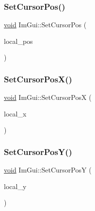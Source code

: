 \subsubsection{\texorpdfstring{Set\+Cursor\+Pos()}{SetCursorPos()}}
{\footnotesize\ttfamily \hyperlink{imgui__impl__opengl3__loader_8h_ac668e7cffd9e2e9cfee428b9b2f34fa7}{void} Im\+Gui\+::\+Set\+Cursor\+Pos (\begin{DoxyParamCaption}\item[{const \hyperlink{structImVec2}{Im\+Vec2} \&}]{local\+\_\+pos }\end{DoxyParamCaption})}

\mbox{\label{namespaceImGui_ae5e6e80ef23bb8df9cd5ac273be8aeb0}} 
\subsubsection{\texorpdfstring{Set\+Cursor\+Pos\+X()}{SetCursorPosX()}}
{\footnotesize\ttfamily \hyperlink{imgui__impl__opengl3__loader_8h_ac668e7cffd9e2e9cfee428b9b2f34fa7}{void} Im\+Gui\+::\+Set\+Cursor\+PosX (\begin{DoxyParamCaption}\item[{float}]{local\+\_\+x }\end{DoxyParamCaption})}

\mbox{\label{namespaceImGui_a0037515d9bd7a28cc27a6e40401c1dec}} 
\subsubsection{\texorpdfstring{Set\+Cursor\+Pos\+Y()}{SetCursorPosY()}}
{\footnotesize\ttfamily \hyperlink{imgui__impl__opengl3__loader_8h_ac668e7cffd9e2e9cfee428b9b2f34fa7}{void} Im\+Gui\+::\+Set\+Cursor\+PosY (\begin{DoxyParamCaption}\item[{float}]{local\+\_\+y }\end{DoxyParamCaption})}

\mbox{\label{namespaceImGui_a632bc7e15b8258f95ab0bc9b2efd5537}} 
